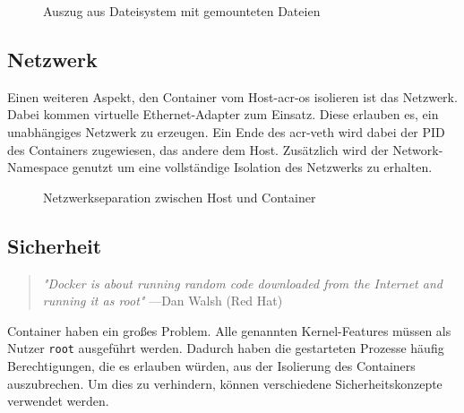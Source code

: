 \begin{figure}[h]
	\centering
	\begin{minipage}{0.9\textwidth}
	\end{minipage}
	\caption{Auszug aus Dateisystem mit gemounteten Dateien}
	\label{fig:mountExample}
\end{figure}

\subsection{Netzwerk}
\label{sec:netzwerk}

Einen weiteren Aspekt, den Container vom Host-\gls{acr-os} isolieren ist das Netzwerk. Dabei kommen virtuelle Ethernet-Adapter zum Einsatz. Diese erlauben es, ein unabhängiges Netzwerk zu erzeugen. Ein Ende des \gls{acr-veth} wird dabei der PID des Containers zugewiesen, das andere dem Host. Zusätzlich wird der Network-Namespace genutzt um eine vollständige Isolation des Netzwerks zu erhalten.

\begin{figure}[h]
	\begin{center}
		\caption{Netzwerkseparation zwischen Host und Container}
		\label{fig:networkContainer}
	\end{center}
\end{figure}

\subsection{Sicherheit}
\label{sec:sicherheit}

\begin{quote}
	\textit{"Docker is about running random code downloaded from the Internet and running it as root"}
	\flushright
	\small{---Dan Walsh (Red Hat)}
\end{quote}

Container haben ein großes Problem. Alle genannten Kernel-Features müssen als Nutzer \texttt{root} ausgeführt werden. Dadurch haben die gestarteten Prozesse häufig Berechtigungen, die es erlauben würden, aus der Isolierung des Containers auszubrechen. Um dies zu verhindern, können verschiedene Sicherheitskonzepte verwendet werden.

